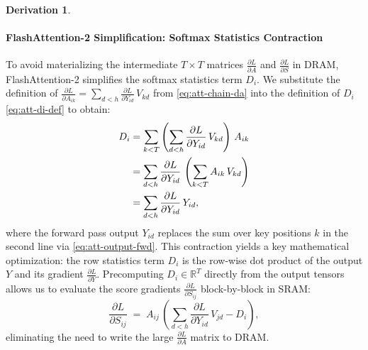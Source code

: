 \documentclass[letterpaper, 10 pt, conference]{ieeeconf}
\newcommand{\R}{\mathbb{R}}
\newcommand{\pdv}[2]{\frac{\partial #1}{\partial #2}}
\newcommand{\dL}[1]{\pdv{L}{#1}}
\theoremstyle{definition}
\newtheorem*{derivation}{Derivation}
\begin{document}
\begin{derivation}
  \paragraph{FlashAttention-2 Simplification: Softmax Statistics Contraction}
  To avoid materializing the intermediate $T \times T$ matrices $\dL{A}$ and $\dL{S}$ in DRAM, FlashAttention-2 \cite{flashattention2} simplifies the softmax statistics term $D_i$. We substitute the definition of $\dL{A_{ik}} = \sum_{d<h} \dL{Y_{id}}\,V_{kd}$ from \eqref{eq:att-chain-da} into the definition of $D_i$ \eqref{eq:att-di-def} to obtain:
  \begin{align}
    D_i
     & = \sum_{k<T} \left( \sum_{d<h} \dL{Y_{id}}\,V_{kd} \right)\,A_{ik} \notag \\
     & = \sum_{d<h} \dL{Y_{id}}\,\left( \sum_{k<T} A_{ik}\,V_{kd} \right) \notag \\
     & = \sum_{d<h} \dL{Y_{id}}\,Y_{id},
    \label{eq:att-di-contract}
  \end{align}
  where the forward pass output $Y_{id}$ replaces the sum over key positions $k$ in the second line via \eqref{eq:att-output-fwd}. This contraction yields a key mathematical optimization: the row statistics term $D_i$ is the row-wise dot product of the output $Y$ and its gradient $\dL{Y}$. Precomputing $D_i \in \R^T$ directly from the output tensors allows us to evaluate the score gradients $\dL{S_{ij}}$ block-by-block in SRAM:
  \begin{equation}
    \dL{S_{ij}} \;=\; A_{ij}\,\left( \sum_{d<h} \dL{Y_{id}}\,V_{jd} - D_i \right),
    \label{eq:att-ds-final}
  \end{equation}
  eliminating the need to write the large $\dL{A}$ matrix to DRAM.


\end{derivation}
\end{document}
